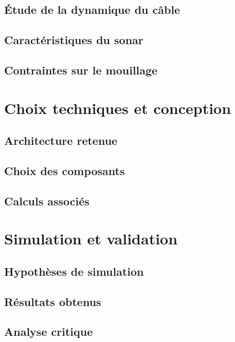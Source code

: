 \documentclass[12pt,a4paper]{article}
\begin{document}
\subsection{Étude de la dynamique du câble}
\subsection{Caractéristiques du sonar}
\subsection{Contraintes sur le mouillage}

\section{Choix techniques et conception}
\subsection{Architecture retenue}
\subsection{Choix des composants}
\subsection{Calculs associés}

\section{Simulation et validation}
\subsection{Hypothèses de simulation}
\subsection{Résultats obtenus}
\subsection{Analyse critique}

\end{document}

